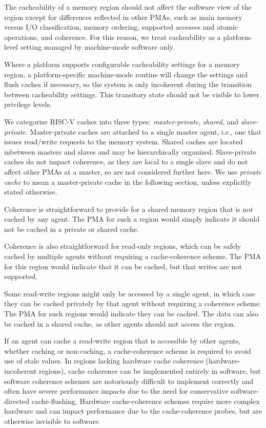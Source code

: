 The cacheability of a memory region should not affect the software
view of the region except for differences reflected in other PMAs,
such as main memory versus I/O classification, memory ordering,
supported accesses and atomic operations, and coherence.  For this
reason, we treat cacheability as a platform-level setting managed by
machine-mode software only.

Where a platform supports configurable cacheability settings for a
memory region, a platform-specific machine-mode routine will change
the settings and flush caches if necessary, so the system is only
incoherent during the transition between cacheability settings.  This
transitory state should not be visible to lower privilege levels.

\begin{commentary}
We categorize RISC-V caches into three types: {\em master-private},
{\em shared}, and {\em slave-private}.  Master-private caches are
attached to a single master agent, i.e., one that issues read/write
requests to the memory system.  Shared caches are located inbetween
masters and slaves and may be hierarchically organized.  Slave-private
caches do not impact coherence, as they are local to a single slave
and do not affect other PMAs at a master, so are not considered
further here.  We use {\em private cache} to mean a master-private
cache in the following section, unless explicitly stated otherwise.

Coherence is straightforward to provide for a shared memory region
that is not cached by any agent.  The PMA for such a region would
simply indicate it should not be cached in a private or shared cache.

Coherence is also straightforward for read-only regions, which can be
safely cached by multiple agents without requiring a cache-coherence
scheme.  The PMA for this region would indicate that it can be cached,
but that writes are not supported.

Some read-write regions might only be accessed by a single agent, in
which case they can be cached privately by that agent without
requiring a coherence scheme.  The PMA for such regions would indicate
they can be cached.  The data can also be cached in a shared cache, as
other agents should not access the region.

If an agent can cache a read-write region that is accessible by other
agents, whether caching or non-caching, a cache-coherence scheme is
required to avoid use of stale values.  In regions lacking hardware
cache coherence (hardware-incoherent regions), cache coherence can be
implemented entirely in software, but software coherence schemes are
notoriously difficult to implement correctly and often have severe
performance impacts due to the need for conservative software-directed
cache-flushing.  Hardware cache-coherence schemes require more complex
hardware and can impact performance due to the cache-coherence probes,
but are otherwise invisible to software.


\end{commentary}

